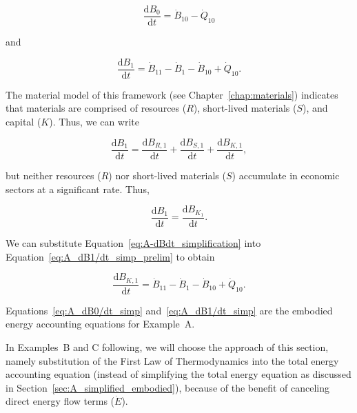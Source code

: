 \begin{equation} \label{eq:A_dB0/dt_simp}
	\frac{\mathrm{d}B_{0}}{\mathrm{d}t} 
	= \dot{B}_{10} 
	- \dot{Q}_{10}
\end{equation}

\noindent and

\begin{equation} \label{eq:A_dB1/dt_simp_prelim}
	\frac{\mathrm{d}B_{1}}{\mathrm{d}t} 
	= \dot{B}_{11}
	- \dot{B}_{1}
	- \dot{B}_{10}
	+ \dot{Q}_{10}.
\end{equation}

\noindent{}The material model of this framework (see Chapter~\ref{chap:materials})
indicates that materials are comprised of 
resources ($R$), 
short-lived materials ($S$), and
capital ($K$).
Thus, we can write 

\begin{equation}
	\frac{\mathrm{d}B_{1}}{\mathrm{d}t} 
	= \frac{\mathrm{d}B_{R,1}}{\mathrm{d}t} 
	+ \frac{\mathrm{d}B_{S,1}}{\mathrm{d}t} 
	+ \frac{\mathrm{d}B_{K,1}}{\mathrm{d}t},
\end{equation}

\noindent{}but neither resources ($R$) nor short-lived
materials ($S$) accumulate in economic sectors at a significant rate.
Thus, 

\begin{equation} \label{eq:A-dBdt_simplification}
	\frac{\mathrm{d}B_{1}}{\mathrm{d}t} 
	= \frac{\mathrm{d}B_{K_{1}}}{\mathrm{d}t}.
\end{equation}

\noindent{}We can substitute Equation~\ref{eq:A-dBdt_simplification}
into Equation~\ref{eq:A_dB1/dt_simp_prelim} to obtain

\begin{equation} \label{eq:A_dB1/dt_simp}
	\frac{\mathrm{d}B_{K,1}}{\mathrm{d}t}
	= \dot{B}_{11}
	- \dot{B}_{1}
	- \dot{B}_{10}
	+ \dot{Q}_{10}.
\end{equation}

\noindent{}Equations~\ref{eq:A_dB0/dt_simp} and~\ref{eq:A_dB1/dt_simp} are 
the embodied energy accounting equations for Example~A.

In Examples~B and C following, we will choose the approach of 
this section, namely substitution of the 
First Law of Thermodynamics into the total energy accounting equation
(instead of simplifying the total energy equation 
as discussed in Section~\ref{sec:A_simplified_embodied}),
because of the benefit of canceling direct energy flow terms ($\dot{E}$). 


